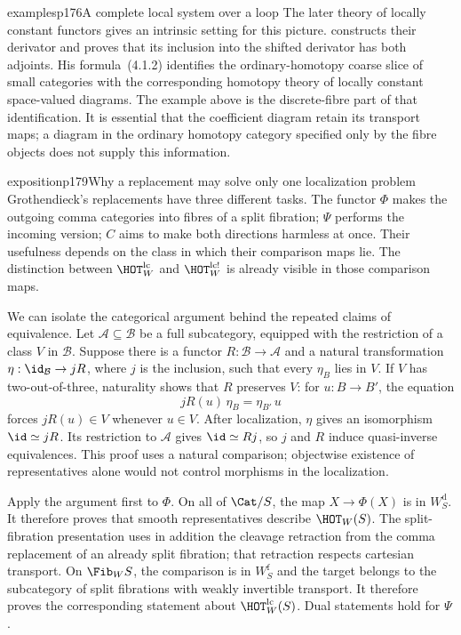 \begin{dcomment}{examples}{p176}{A complete local system over a loop}
The later theory of locally constant functors gives an intrinsic setting for this picture. \citet[Theorem~3.12]{Cisinski2009LocallyConstant} constructs their derivator and proves that its inclusion into the shifted derivator has both adjoints. His formula~(4.1.2) identifies the ordinary-homotopy coarse slice of small categories with the corresponding homotopy theory of locally constant space-valued diagrams. The example above is the discrete-fibre part of that identification. It is essential that the coefficient diagram retain its transport maps; a diagram in the ordinary homotopy category specified only by the fibre objects does not supply this information.
\end{dcomment}

\begin{dcomment}{exposition}{p179}{Why a replacement may solve only one localization problem}
Grothendieck's replacements have three different tasks. The functor $\Phi$ makes the outgoing comma categories into fibres of a split fibration; $\Psi$ performs the incoming version; $C$ aims to make both directions harmless at once. Their usefulness depends on the class in which their comparison maps lie. The distinction between $\HOT_W^{\mathrm{lc}}$ and $\HOT_W^{\mathrm{lc}!}$ is already visible in those comparison maps.

We can isolate the categorical argument behind the repeated claims of equivalence. Let $\mathcal A\subseteq\mathcal B$ be a full subcategory, equipped with the restriction of a class $V$ in $\mathcal B$. Suppose there is a functor $R:\mathcal B\to\mathcal A$ and a natural transformation $\eta:\id_{\mathcal B}\to jR$, where $j$ is the inclusion, such that every $\eta_B$ lies in $V$. If $V$ has two-out-of-three, naturality shows that $R$ preserves $V$: for $u:B\to B'$, the equation
\[
 jR(u)\,\eta_B=\eta_{B'}\,u
\]
forces $jR(u)\in V$ whenever $u\in V$. After localization, $\eta$ gives an isomorphism $\id\simeq jR$. Its restriction to $\mathcal A$ gives $\id\simeq Rj$, so $j$ and $R$ induce quasi-inverse equivalences. This proof uses a natural comparison; objectwise existence of representatives alone would not control morphisms in the localization.

Apply the argument first to $\Phi$. On all of $\Cat/S$, the map $X\to\Phi(X)$ is in $W_S^{\mathrm d}$. It therefore proves that smooth representatives describe $\HOT_W(S)$. The split-fibration presentation uses in addition the cleavage retraction from the comma replacement of an already split fibration; that retraction respects cartesian transport. On $\Fib_W S$, the comparison is in $W_S^{\mathrm f}$ and the target belongs to the subcategory of split fibrations with weakly invertible transport. It therefore proves the corresponding statement about $\HOT_W^{\mathrm{lc}}(S)$. Dual statements hold for $\Psi$.


\end{dcomment}
